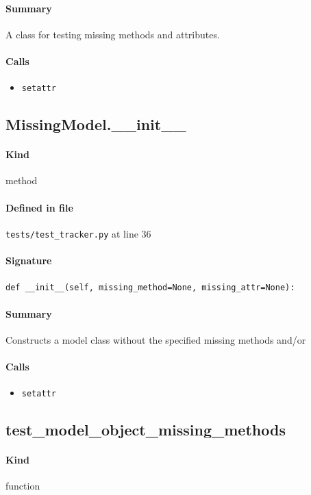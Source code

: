 \documentclass[11pt]{report}
\begin{document}
\paragraph{Summary} A class for testing missing methods and attributes.
\paragraph{Calls}
\begin{itemize}[leftmargin=*]
  \item \texttt{setattr}
\end{itemize}
\subsection{MissingModel.\_\_init\_\_}
\label{def:tests-test_tracker.py:MissingModel.__init__:L36}
\paragraph{Kind} method
\paragraph{Defined in file} \texttt{tests/test\_tracker.py} at line 36
\paragraph{Signature} \texttt{def \_\_init\_\_(self, missing\_method=None, missing\_attr=None):}
\paragraph{Summary} Constructs a model class without the specified missing methods and/or
\paragraph{Calls}
\begin{itemize}[leftmargin=*]
  \item \texttt{setattr}
\end{itemize}
\subsection{test\_model\_object\_missing\_methods}
\label{def:tests-test_tracker.py:test_model_object_missing_methods:L55}
\paragraph{Kind} function
\end{document}
